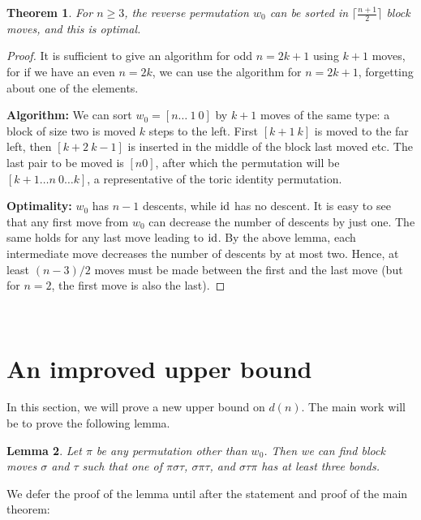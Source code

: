 \documentclass[11pt]{amsart} %
\newtheorem{theorem}{Theorem}[section]
\newtheorem{lemma}[theorem]{Lemma}
\newcommand{\id}{\mathop{\rm id}}
\begin{document}
\begin{theorem}\label{th:jw}
For $n\ge 3$, the reverse permutation $w_0$ can be sorted in $
\lceil \frac{n+1}{2} \rceil$ block moves, and this is optimal.
\end{theorem}
\begin{proof}
It is sufficient to give an algorithm for odd $n=2k\!+\!1$ using
$k\!+\!1$ moves, for if we have an even $n=2k$, we can use the
algorithm for $n=2k\!+\!1$, forgetting about one of the elements.

{\bf Algorithm:} We can sort  $w_0=[n\ldots\ 1\ 0]$ by $k+1$ moves
of the same type: a block of size two is moved $k$ steps to the
left. First $[k\! +\! 1\ k]$ is moved to the far left, then $[k\!
+\! 2\ k\! -\! 1]$ is inserted in the middle of the block last
moved etc. The last pair to be moved is $[n 0]$, after which the
permutation will be $[k\! +\! 1\ldots n\ 0\ldots k]$, a
representative of the toric identity permutation.

{\bf Optimality: } $w_0$ has $n-1$ descents, while $\id$ has no
descent. It is easy to see that any first move from $w_0$ can
decrease the number of descents by just one.  The same holds for
any last move leading to $\id$.  By the above lemma, each intermediate move decreases
the number of descents by at most two.
Hence, at least $(n-3)/2$ moves must be made between the first and
the last move (but for $n=2$, the first move is also the last).
\end{proof}  

\

\section{An improved upper bound}
In this section, we will prove a new upper bound on $d(n)$. The main
work will be to prove the following lemma.

\begin{lemma}\label{lm:3-in-2}
Let $\pi$ be any permutation other than $w_0$.
Then we can find block moves $\sigma$ and $\tau$ such that one of
$\pi\sigma\tau$, $\sigma\pi\tau$, and $\sigma\tau\pi$ has at least
three bonds.
\end{lemma}

We defer the proof of the lemma until after the statement and proof 
of the main theorem:
\end{document}
